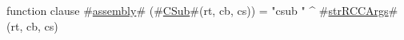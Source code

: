 function clause #\hyperref[sailMIPSzassembly]{assembly}# (#\hyperref[sailMIPSzCSub]{CSub}#(rt, cb, cs)) = "csub " ^ #\hyperref[sailMIPSzstrRCCArgs]{strRCCArgs}#(rt, cb, cs)
